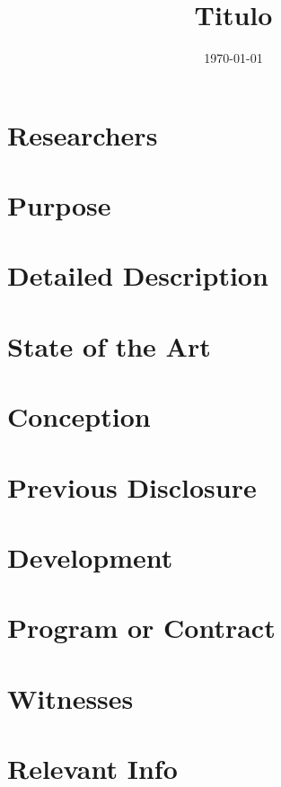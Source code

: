 \documentclass{article}
\title{
Titulo
}
\date{\today}
\begin{document}
\maketitle

\section*{Researchers}

\section*{Purpose}

\section*{Detailed Description}

\section*{State of the Art}

\section*{Conception}

\section*{Previous Disclosure}

\section*{Development}

\section*{Program or Contract}

\section*{Witnesses}

\section*{Relevant Info}
\end{document}
